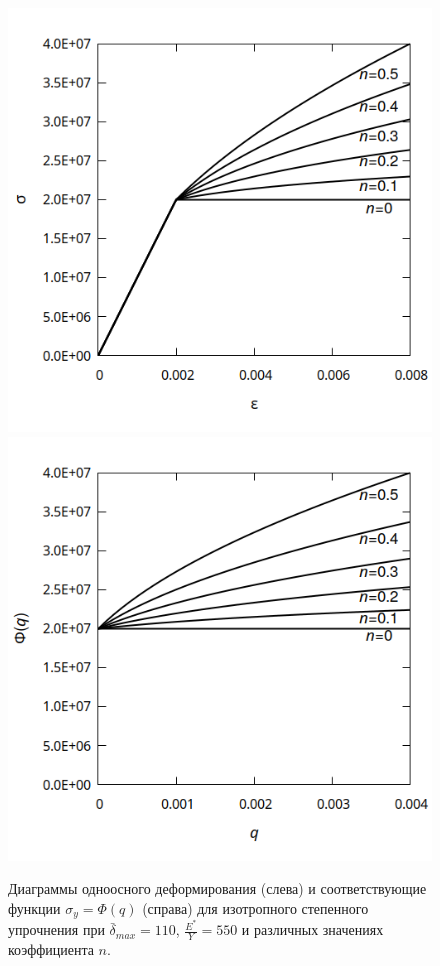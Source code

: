\documentclass[]{article}
\begin{document}
\begin{figure}[h!]
	\centering
	\includegraphics[height=0.25\textheight]{pictures/curves_diagr.png}
	\includegraphics[height=0.25\textheight]{pictures/curves_f.png}
	\caption{ Диаграммы одноосного деформирования (слева) и соответствующие функции $\sigma_y=\Phi\left(q\right)$ (справа) для изотропного степенного упрочнения при ${\bar{\delta}_{max}=110}$, ${\frac{E^*}{Y}=550}$ и различных значениях коэффициента $n$.
	}
	\label{fig:curves}
\end{figure}
\end{document}
